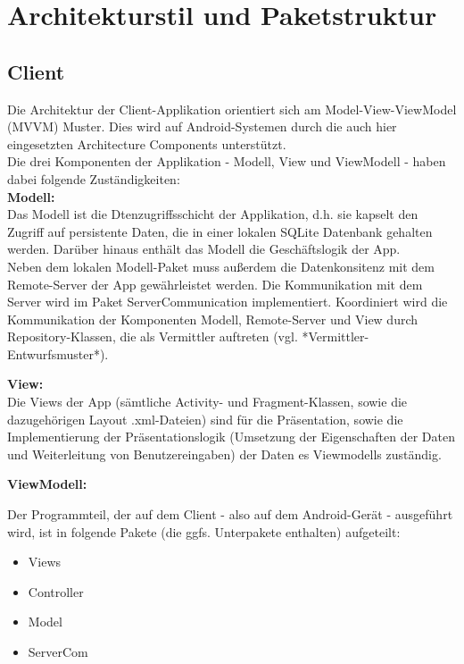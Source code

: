 \documentclass[11pt,a4paper]{report}
\begin{document}
\section{Architekturstil und Paketstruktur}

\subsection{Client}
Die Architektur der Client-Applikation orientiert sich am Model-View-ViewModel (MVVM) Muster. Dies wird auf Android-Systemen durch die auch hier eingesetzten Architecture Components unterstützt. \\

Die drei Komponenten der Applikation - Modell, View und ViewModell - haben dabei folgende Zuständigkeiten:\\

\textbf{Modell:}\\
Das Modell ist die Dtenzugriffsschicht der Applikation, d.h. sie kapselt den Zugriff auf persistente Daten, die in einer lokalen SQLite Datenbank gehalten werden. Darüber hinaus enthält das Modell die Geschäftslogik der App.\\

Neben dem lokalen Modell-Paket muss außerdem die Datenkonsitenz mit dem Remote-Server der App gewährleistet werden. Die Kommunikation mit dem Server wird im Paket ServerCommunication implementiert. Koordiniert wird die Kommunikation der Komponenten Modell, Remote-Server und View durch Repository-Klassen, die als Vermittler auftreten (vgl. *Vermittler-Entwurfsmuster*).

\textbf{View:}\\
Die Views der App (sämtliche Activity- und Fragment-Klassen, sowie die dazugehörigen Layout .xml-Dateien) sind für die Präsentation, sowie die Implementierung der Präsentationslogik (Umsetzung der Eigenschaften der Daten und Weiterleitung von Benutzereingaben) der Daten es Viewmodells zuständig.

\textbf{ViewModell:}


Der Programmteil, der auf dem Client - also auf dem Android-Gerät - ausgeführt wird, ist in folgende Pakete (die ggfs. Unterpakete enthalten) aufgeteilt:
\begin{itemize}
	\item Views
	\item Controller
	\item Model
	\item ServerCom
\end{itemize}
\end{document}
